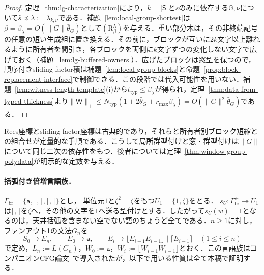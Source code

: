 \documentclass[11pt,a4paper]{ltjsarticle}
\numberwithin{equation}{section}
\theoremstyle{plain}
\theoremstyle{definition}
\theoremstyle{remark}
\newcommand{\Wit}{\mathsf{W}}
\begin{document}
\begin{proof}
定理~\ref{thm:lg-characterization}により，$k=|\mathsf S|$と$s$のみに依存する${\mathbb G},\nu$について$\widehat s\preceq\lambda:=\lambda_{k,\nu}$である．補題~\ref{lem:local-group-shortest}は$\beta=\beta_\lambda=O(\|G\|\bar\theta_G)$として$(\mathrm R_\beta^\lambda)$を与える．重い部分木は，その非終端記号の任意の短い生成組に置き換える．その前に，ブロックが互いに$2k$文字以上離れるように所有者を間引き，各ブロックを両側に$k$文字ずつの変化しない文字で広げておく（補題~\ref{lem:lg-buffered-owners}）．広げたブロックは窓型を保つので，順序付きsliding-factor積は補題~\ref{lem:local-group-blocks}と命題~\ref{prop:block-replacement-interface}で制御できる．この段階では代入可能性を用いない．補題~\ref{lem:witness-length-template}(i)から$t_{\mathrm{typ}}\le\beta_\lambda$が得られ，定理~\ref{thm:data-from-typed-thickness}より$\|\Wit\|_+\le N_{\mathrm{typ}}(1+2\bar\theta_G+r_{\max}\beta_\lambda)=O(\|G\|^2\bar\theta_G)$である．
\end{proof}

Rees座標とsliding-factor座標は古典的であり，それらと所有者別ブロック短縮との組合せが定量的な手順である．こうして局所群型付けと窓・群型付けは$\|G\|$について同じ二次の依存性をもつ．後者については定理~\ref{thm:window-group-polydata}が明示的な定数を与える．

\paragraph{括弧付き倍増言語族．}
$\Gamma_{\mathrm{br}}=\{\mathtt a,\lfloor,\rfloor,\lceil,\rceil\}$とし，
単位元$1$と$\zeta^2=\zeta$をもつ$U_1=\{1,\zeta\}$をとる．
$s_U:\Gamma_{\mathrm{br}}^+\twoheadrightarrow U_1$は$\lceil,\rceil$を$\zeta$へ，その他の文字を$1$へ送る型付けとする．したがって$s_U(w)=1$となるのは，天井括弧を含まない空でない語のちょうど全てである．$n\ge1$に対し，ファンアウト1の文法$G_n$を
\[
 S_0\to E_n,\qquad E_0\to\mathtt a,\qquad
 E_i\to\lfloor E_{i-1}E_{i-1}\rfloor
 \mid\lceil E_{i-1}\rceil\quad(1\le i\le n)
\]
で定め，$L_n:=L(G_n)$，$W_0:=\mathtt a$，$W_i:=\lfloor W_{i-1}W_{i-1}\rfloor$とおく．この言語族はコンパニオンCFG論文~\cite[Proposition~6.4]{kuriyamaCFG}で導入されたが，以下で用いる性質は全て本稿で証明する．
\end{document}
